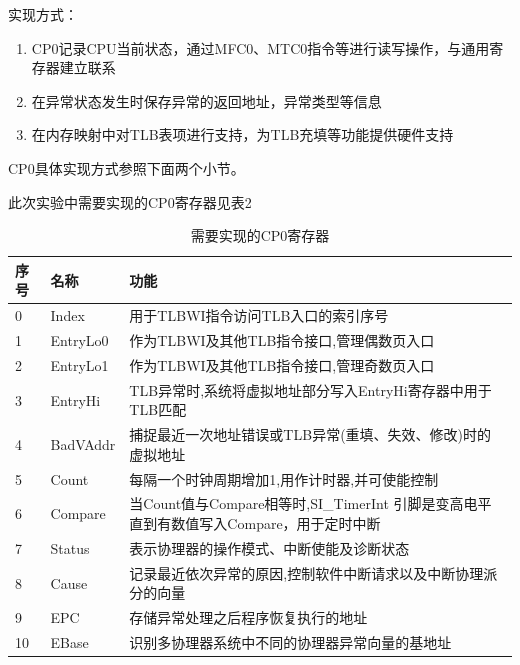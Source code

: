             实现方式：
            \begin{enumerate}
                \item
                    CP0记录CPU当前状态，通过MFC0、MTC0指令等进行读写操作，与通用寄存器建立联系
                \item
                    在异常状态发生时保存异常的返回地址，异常类型等信息
                \item
                    在内存映射中对TLB表项进行支持，为TLB充填等功能提供硬件支持
            \end{enumerate}

            CP0具体实现方式参照下面两个小节。

            此次实验中需要实现的CP0寄存器见表2

            \begin{table}
            \centering
            \caption{需要实现的CP0寄存器}
            \begin{tabularx}{\textwidth}{|l|l|X|}
            \hline
            序号 & 名称 & 功能 \\
            \hline
            0 & Index & 用于TLBWI指令访问TLB入口的索引序号 \\
            \hline
            1 & EntryLo0 & 作为TLBWI及其他TLB指令接口,管理偶数页入口 \\
            \hline
            2 & EntryLo1 & 作为TLBWI及其他TLB指令接口,管理奇数页入口 \\
            \hline
            3 & EntryHi & TLB异常时,系统将虚拟地址部分写入EntryHi寄存器中用于TLB匹配 \\
            \hline
            4 & BadVAddr & 捕捉最近一次地址错误或TLB异常(重填、失效、修改)时的虚拟地址 \\
            \hline
            5 & Count & 每隔一个时钟周期增加1,用作计时器,并可使能控制 \\
            \hline
            6 & Compare & 当Count值与Compare相等时,SI\_TimerInt 引脚是变高电平直到有数值写入Compare，用于定时中断 \\
            \hline
            7 & Status & 表示协理器的操作模式、中断使能及诊断状态 \\
            \hline
            8 & Cause & 记录最近依次异常的原因,控制软件中断请求以及中断协理派分的向量 \\
            \hline
            9 & EPC & 存储异常处理之后程序恢复执行的地址 \\
            \hline
            10 & EBase & 识别多协理器系统中不同的协理器异常向量的基地址 \\
            \hline
            \end{tabularx}
            \end{table}

